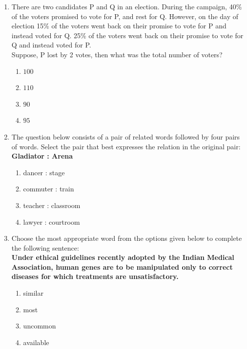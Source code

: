 \documentclass[journal]{IEEEtran}
\numberwithin{equation}{enumi}
\numberwithin{figure}{enumi}
\begin{document}
\begin{enumerate}
\item There are two candidates P and Q in an election. During the campaign, 40\% of the voters promised to vote for P, and rest for Q. However, on the day of election 15\% of the voters went back on their promise to vote for P and instead voted for Q. 25\% of the voters went back on their promise to vote for Q and instead voted for P. \\ Suppose, P lost by 2 votes, then what was the total number of voters?
\hfill{}
\begin{multicols}{4}
\begin{enumerate}
   \item $100$
   \item $110$
   \item $90$
    \item $95$
\end{enumerate}
\end{multicols}


   
\item The question below consists of a pair of related words followed by four pairs of words. Select the pair that best expresses the relation in the original pair:\\
\textbf{Gladiator : Arena}

\hfill{}
\begin{enumerate}
    \item  dancer : stage
     \item commuter : train
     \item teacher : classroom
     \item lawyer : courtroom
\end{enumerate}


   
\item Choose the most appropriate word from the options given below to complete the following sentence:\\
\textbf{Under ethical guidelines recently adopted by the Indian Medical Association, human genes are to be manipulated only to correct diseases for which \underline{\hspace{2cm}} treatments are unsatisfactory.}

\begin{enumerate}
    \item   similar \hfill{}
     \item most
     \item uncommon
     \item available
\end{enumerate}


\end{enumerate}
\end{document}
